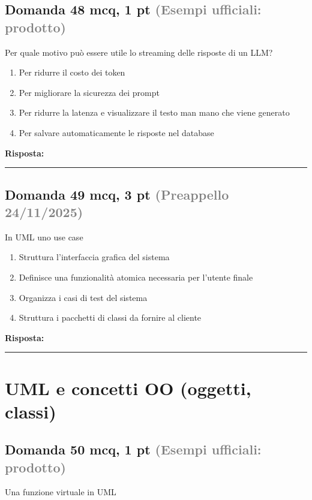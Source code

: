\documentclass[a4paper,11pt]{article}
\begin{document}
\subsection*{Domanda 48 \hfill {\small mcq, 1 pt \textcolor{gray}{(Esempi ufficiali: prodotto)}}}
Per quale motivo può essere utile lo streaming delle risposte di un LLM?

\begin{enumerate}[label=\alph*)]
\item Per ridurre il costo dei token
\item Per migliorare la sicurezza dei prompt
\item Per ridurre la latenza e visualizzare il testo man mano che viene generato
\item Per salvare automaticamente le risposte nel database
\end{enumerate}
\vspace{0.2cm}
\noindent\textbf{Risposta:}\par
\vspace{1.5cm}\hrule


\subsection*{Domanda 49 \hfill {\small mcq, 3 pt \textcolor{gray}{(Preappello 24/11/2025)}}}
In UML uno use case

\begin{enumerate}[label=\alph*)]
\item Struttura l'interfaccia grafica del sistema
\item Definisce una funzionalità atomica necessaria per l'utente finale
\item Organizza i casi di test del sistema
\item Struttura i pacchetti di classi da fornire al cliente
\end{enumerate}
\vspace{0.2cm}
\noindent\textbf{Risposta:}\par
\vspace{1.5cm}\hrule


\section{UML e concetti OO (oggetti, classi)}

\subsection*{Domanda 50 \hfill {\small mcq, 1 pt \textcolor{gray}{(Esempi ufficiali: prodotto)}}}
Una funzione virtuale in UML
\end{document}

